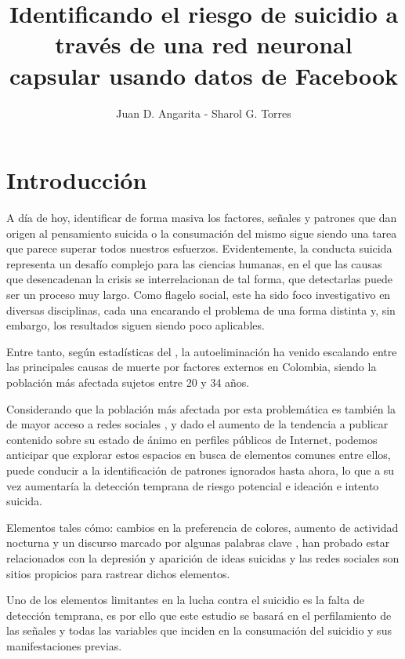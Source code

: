 \documentclass[12pt, donotrepeattitle, jou]{apa6}
\title{Identificando el riesgo de suicidio a través de una red neuronal capsular usando datos de Facebook}
\author{Juan D. Angarita - Sharol G. Torres}
\affiliation{Universidad Popular del Cesar}
\begin{document}
    \maketitle
    \section{Introducción}
    A día de hoy, identificar de forma masiva los factores, señales y patrones que dan origen al pensamiento suicida o la
    consumación del mismo sigue siendo una tarea que parece superar todos nuestros esfuerzos. Evidentemente, la conducta suicida representa un desafío complejo para las ciencias humanas, en el que las causas que desencadenan la crisis se interrelacionan de tal forma, que detectarlas puede ser un proceso muy largo. Como flagelo social, este ha sido foco investigativo en diversas disciplinas, cada una encarando el problema de una forma distinta y, sin embargo, los resultados siguen siendo poco aplicables. 
    
    Entre tanto, según estadísticas del \textcite{MedicinaLegal}, la autoeliminación ha venido escalando entre las principales causas de muerte por factores externos en Colombia, siendo la población más afectada sujetos entre 20 y 34 años.
    
    Considerando que la población más afectada por esta problemática es también la de mayor acceso a redes sociales \parencite{Facebook}, y dado el aumento de la tendencia a publicar contenido sobre su estado de ánimo en perfiles públicos de Internet, podemos anticipar que explorar estos espacios en busca de elementos comunes entre ellos, puede conducir a la identificación de patrones ignorados hasta ahora, lo que a su vez aumentaría la detección temprana de riesgo potencial e ideación e intento suicida.
    
    Elementos tales cómo: cambios en la preferencia de colores\parencite{Carruthers2010}, aumento de actividad nocturna \parencite{Season} y un discurso marcado por algunas palabras clave \parencite{TextAnalysis}, han probado estar relacionados con la depresión y aparición de ideas suicidas y las redes sociales son sitios propicios para rastrear dichos elementos.

    Uno de los elementos limitantes en la lucha contra el suicidio es la falta de detección temprana, es por ello que este estudio se basará en el perfilamiento de las señales y todas las variables que inciden en la consumación del suicidio y sus manifestaciones previas.
    
\end{document}
